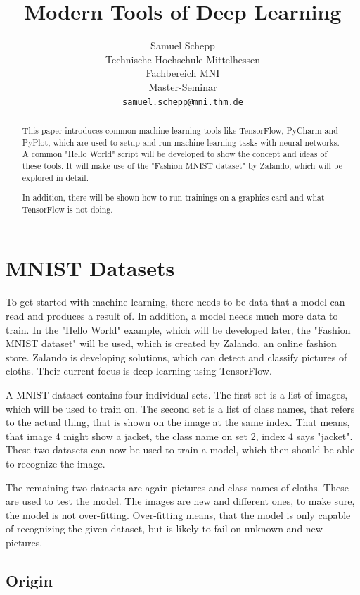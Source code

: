 \documentclass[11pt]{article}
\title{Modern Tools of Deep Learning}
\author{Samuel Schepp \\
  Technische Hochschule Mittelhessen \\
  Fachbereich MNI \\
  Master-Seminar \\
  {\tt samuel.schepp@mni.thm.de} \\
  }
\date{}
\begin{document}
\maketitle
\begin{abstract}
This paper introduces common machine learning tools like TensorFlow, PyCharm and PyPlot, which are used to setup and run machine learning tasks with neural networks.
A common "Hello World" script will be developed to show the concept and ideas of these tools.
It will make use of the "Fashion MNIST dataset" by Zalando, which will be explored in detail.

In addition, there will be shown how to run trainings on a graphics card and what TensorFlow is not doing.

\end{abstract}

\section{MNIST Datasets}
\label{sec:mnistdataset}

To get started with machine learning, there needs to be data that a model can read and produces a result of.
In addition, a model needs much more data to train.
In the "Hello World" example, which will be developed later, the "Fashion MNIST dataset" will be used, which is created by Zalando, an online fashion store.
Zalando is developing solutions, which can detect and classify pictures of cloths.
Their current focus is deep learning using TensorFlow.

A MNIST dataset contains four individual sets.
The first set is a list of images, which will be used to train on.
The second set is a list of class names, that refers to the actual thing, that is shown on the image at the same index.
That means, that image 4 might show a jacket, the class name on set 2, index 4 says "jacket".
These two datasets can now be used to train a model, which then should be able to  recognize the image.

The remaining two datasets are again pictures and class names of cloths.
These are used to test the model.
The images are new and different ones, to make sure, the model is not over-fitting.
Over-fitting means, that the model is only capable of recognizing the given dataset, but is likely to fail on unknown and new pictures.

\subsection{Origin}
\end{document}
